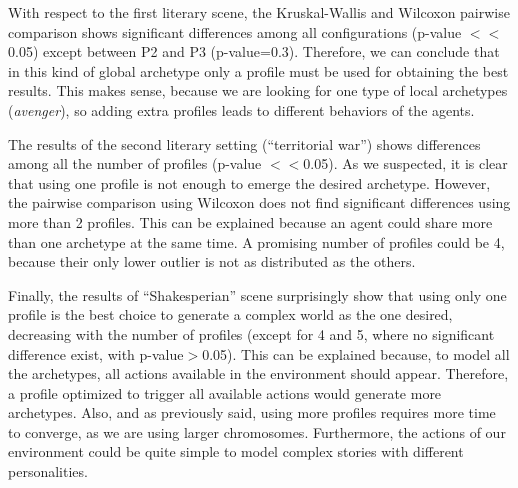 \documentclass[letterpaper]{article}
\begin{document}
With respect to the first literary scene, the Kruskal-Wallis and Wilcoxon
pairwise comparison shows significant differences among all
configurations (p-value $<<$ 0.05) except between P2 and P3
(p-value=0.3). Therefore, we can conclude that in this kind of global
archetype only a profile must be used for obtaining the best
results. This makes sense, because we are looking for one type of
local archetypes ({\em avenger}), so adding extra profiles leads to
different behaviors of the agents. 



The results of the second literary setting (``territorial war'') shows differences among all the number of profiles (p-value $<<$0.05). As we suspected, it is clear that using one profile is not enough to emerge the desired archetype. However, the pairwise comparison using Wilcoxon does not find significant differences using more than 2 profiles. This can be explained because an agent could share more than one archetype at the same time.  A promising number of profiles could be 4, because their only lower outlier is not as distributed as the others. %

Finally, the results of ``Shakesperian'' scene surprisingly show that using only one profile is the best choice to generate a complex world as the one desired, decreasing with the number of profiles (except for 4 and 5, where no significant difference exist, with p-value$>$0.05). This can be explained because, to model all the archetypes, all actions available in the environment should appear. Therefore, a profile optimized to trigger all available actions would generate more archetypes. Also, and as previously said, using more profiles requires more time to converge, as we are using larger chromosomes. Furthermore, the actions of our environment could be quite simple to model complex stories with different personalities.

\begin{table}
\begin{center}
\end{center}
\vskip 0.25cm
\caption{Results for 30 executions of each configuration using 1 to 5 profiles (average best fitness $\pm$ std. dev).}
\label{tab:results}
\end{table}
\end{document}

